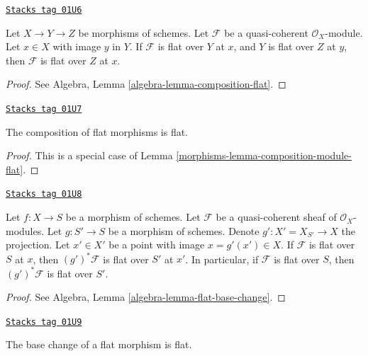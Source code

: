 \begin{lemma}
\label{morphisms-lemma-composition-module-flat}
\href{https://stacks.math.columbia.edu/tag/01U6}{\texttt{Stacks tag 01U6}}

Let $X \to Y \to Z$ be morphisms of schemes. Let $\mathcal{F}$ be a
quasi-coherent $\mathcal{O}_X$-module. Let $x \in X$ with image $y$ in $Y$.
If $\mathcal{F}$ is flat over $Y$ at $x$, and $Y$ is flat over $Z$ at
$y$, then $\mathcal{F}$ is flat over $Z$ at $x$.
\end{lemma}

\begin{proof}
See Algebra, Lemma \ref{algebra-lemma-composition-flat}.
\end{proof}

\begin{lemma}
\label{morphisms-lemma-composition-flat}
\href{https://stacks.math.columbia.edu/tag/01U7}{\texttt{Stacks tag 01U7}}

The composition of flat morphisms is flat.
\end{lemma}

\begin{proof}

This is a special case of Lemma \ref{morphisms-lemma-composition-module-flat}.
\end{proof}

\begin{lemma}
\label{morphisms-lemma-base-change-module-flat}
\href{https://stacks.math.columbia.edu/tag/01U8}{\texttt{Stacks tag 01U8}}

Let $f : X \to S$ be a morphism of schemes.
Let $\mathcal{F}$ be a quasi-coherent sheaf of $\mathcal{O}_X$-modules.
Let $g : S' \to S$ be a morphism of schemes.
Denote $g' : X' = X_{S'} \to X$ the projection.
Let $x' \in X'$ be a point with image $x = g'(x') \in X$.
If $\mathcal{F}$ is flat over $S$ at $x$, then
$(g')^*\mathcal{F}$ is flat over $S'$ at $x'$.
In particular, if $\mathcal{F}$ is flat over $S$, then
$(g')^*\mathcal{F}$ is flat over $S'$.
\end{lemma}

\begin{proof}
See Algebra, Lemma \ref{algebra-lemma-flat-base-change}.
\end{proof}

\begin{lemma}
\label{morphisms-lemma-base-change-flat}
\href{https://stacks.math.columbia.edu/tag/01U9}{\texttt{Stacks tag 01U9}}

The base change of a flat morphism is flat.
\end{lemma}

